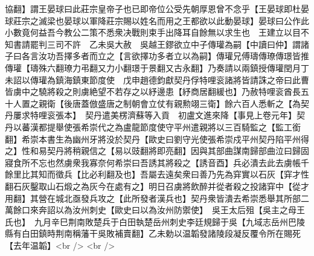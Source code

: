 協翻】謂王晏球曰此莊宗皇帝子也已即帝位公受先朝厚恩曾不念乎【王晏球即杜晏球莊宗之滅梁也晏球以軍降莊宗賜以姓名而用之王都欲以此動晏球】晏球曰公作此小數竟何益吾今教公二策不悉衆决戰則束手出降耳自餘無以求生也　王建立以目不知書請罷判三司不許　乙未吳大赦　吳越王鏐欲立中子傳瓘為嗣【中讀曰仲】謂諸子曰各言汝功吾擇多者而立之【言欲擇功多者立以為嗣】傳瓘兄傅璹傳璙傳璟皆推傳瓘【璹殊六翻璙力弔翻又力小翻璟于景翻又古永翻】乃奏請以兩鎮授傳瓘閏月丁未詔以傳瓘為鎮海鎮東節度使　戊申趙德鈞獻契丹俘特哩衮諸將皆請誅之帝曰此曹皆虜中之驍將殺之則虜絶望不若存之以紓邊患【紓商居翻緩也】乃赦特哩衮酋長五十人置之親衛【後唐蓋倣盛唐之制朝會立仗有親勲翊三衛】餘六百人悉斬之【為契丹屢求特哩衮張本】　契丹遣美楞濟蘇等入貢　初盧文進來降【事見上卷元年】契丹以蕃漢都提舉使張希崇代之為盧龍節度使守平州遣親將以三百騎監之【監工銜翻】希崇本書生為幽州牙將没於契丹【歐史曰劉守光使張希崇戍平州契丹陷平州得之】性和易契丹將稍親信之【易以豉翻將即亮翻】因與其部曲謀南歸部曲泣曰歸固寢食所不忘也然虜衆我寡奈何希崇曰吾誘其將殺之【誘音酉】兵必潰去此去虜帳千餘里比其知而徵兵【比必利翻及也】吾屬去遠矣衆曰善乃先為穽實以石灰【穽才性翻石灰鑿取山石煅之為灰今在處有之】明日召虜將飲醉并從者殺之投諸穽中【從才用翻】其營在城北亟發兵攻之【此所發者漢兵也】契丹衆皆潰去希崇悉舉其所部二萬餘口來奔詔以為汝州刺史【歐史曰以為汝州防禦使】　吳王太后殂【吳主之母王氏也】　九月辛巳荆南敗楚兵于白田執楚岳州刺史李廷規歸于吳【九域志岳州巴陵縣有白田鎮時荆南稱藩干吳敗補賣翻】乙未勅以温韜發諸陵段凝反覆令所在賜死【去年温韜】<br />
<br />
